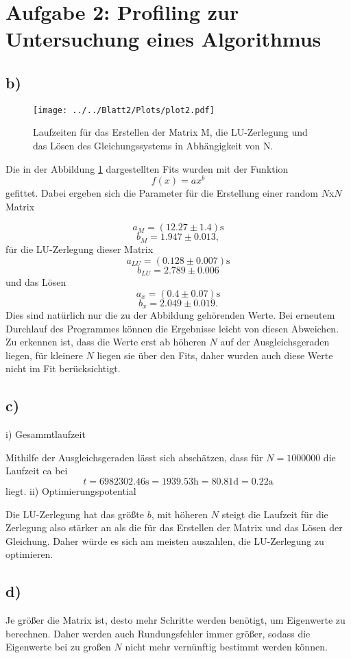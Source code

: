 \section*{Aufgabe 2: Profiling zur Untersuchung eines Algorithmus}

\subsection*{b)}

  \begin{figure}
    \texttt{[image: ../../Blatt2/Plots/plot2.pdf]}
    \caption{Laufzeiten für das Erstellen der Matrix M, die LU-Zerlegung und das Lösen des Gleichungssystems in Abhängigkeit von N.}
    \label{fig:A2}
  \end{figure}

  \noindent Die in der Abbildung \ref{fig:A2} dargestellten Fits wurden mit der Funktion
  \begin{equation}
    f(x)=a x^b
  \end{equation}
  gefittet. Dabei ergeben sich die Parameter für die Erstellung einer random $N$x$N$ Matrix

  $$a_M = (12.27 \pm 1.4) \text{s}$$
  $$b_M = 1.947 \pm 0.013 ,$$
  für die LU-Zerlegung dieser Matrix
  $$a_{LU} = (0.128 \pm 0.007) \text{s}$$
  $$b_{LU} = 2.789 \pm 0.006$$
  und das Lösen
  $$a_x = (0.4 \pm 0.07) \text{s}$$
  $$b_x = 2.049 \pm 0.019.$$
  Dies sind natürlich nur die zu der Abbildung gehörenden Werte. Bei erneutem Durchlauf des Programmes
  können die Ergebnisse leicht von diesen Abweichen. Zu erkennen ist, dass die Werte erst ab höheren $N$
  auf der Ausgleichsgeraden liegen, für kleinere $N$ liegen sie über den Fits, daher wurden auch diese
  Werte nicht im Fit berücksichtigt.

  \subsection*{c)}

    \noindent i) Gesammtlaufzeit

    \noindent Mithilfe der Ausgleichsgeraden lässt sich abschätzen, dass für $N=1000000$
    die Laufzeit ca bei
    $$t= 6982302.46 \text{s} =  1939.53 \text{h} = 80.81 \text{d}= 0.22 \text{a}$$
    liegt.
    \noindent ii) Optimierungspotential

    \noindent Die LU-Zerlegung hat das größte $b$, mit höheren $N$ steigt die Laufzeit für die Zerlegung
    also stärker an als die für das Erstellen der Matrix und das Lösen der Gleichung. Daher
    würde es sich am meisten auszahlen, die LU-Zerlegung zu optimieren.


  \subsection*{d)}

    \noindent Je größer die Matrix ist, desto mehr Schritte werden benötigt, um Eigenwerte zu berechnen. Daher
    werden auch Rundungsfehler immer größer, sodass die Eigenwerte bei zu großen $N$ nicht mehr vernünftig bestimmt
    werden können.

